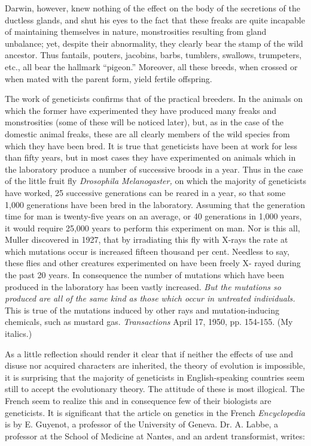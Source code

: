 Darwin, however, knew nothing of the effect on the body of the secretions of the ductless
glands, and shut his eyes to the fact that these freaks are quite incapable of maintaining
themselves in nature, monstrosities resulting from gland unbalance; yet, despite their
abnormality, they clearly bear the stamp of the wild ancestor. Thus fantails, pouters, jacobins,
barbs, tumblers, swallows, trumpeters, etc., all bear the hallmark ``pigeon.'' Moreover, all
these breeds, when crossed or when mated with the parent form, yield fertile offspring.

The work of geneticists confirms that of the practical breeders. In the animals on which the
former have experimented they have produced many freaks and monstrosities (some of these
will be noticed later), but, as in the case of the domestic animal freaks, these are all clearly
members of the wild species from which they have been bred. It is true that geneticists have
been at work for less than fifty years, but in most cases they have experimented on animals
which in the laboratory produce a number of successive broods in a year. Thus in the case of
the little fruit fly \textit{Drosophila Melanogaster,} on which the majority of geneticists have
worked, 25 successive generations can be reared in a year, so that some 1,000 generations
have been bred in the laboratory. Assuming that the generation time for man is twenty-five
years on an average, or 40 generations in 1,000 years, it would require 25,000 years to
perform this experiment on man. Nor is this all, Muller discovered in 1927, that by
irradiating this fly with X-rays the rate at which mutations occur is increased fifteen thousand
per cent. Needless to say, these flies and other creatures experimented on have been freely X-
rayed during the past 20 years. In consequence the number of mutations which have been
produced in the laboratory has been vastly increased. \textit{But the mutations so produced are all
of the same kind as those which occur in untreated individuals.} This is true of the mutations
induced by other rays and mutation-inducing chemicals, such as mustard gas. \textit{Transactions}
April 17, 1950, pp. 154-155. (My italics.)

As a little reflection should render it clear that if neither the effects of use and disuse nor
acquired characters are inherited, the theory of evolution is impossible, it is surprising that
the majority of geneticists in English-speaking countries seem still to accept the evolutionary
theory. The attitude of these is most illogical. The French seem to realize this and in
consequence few of their biologists are geneticists. It is significant that the article on genetics
in the French \textit{Encyclopedia} is by E. Guyenot, a professor of the University of Geneva. Dr. A.
Labbe, a professor at the School of Medicine at Nantes, and an ardent transformist, writes:

